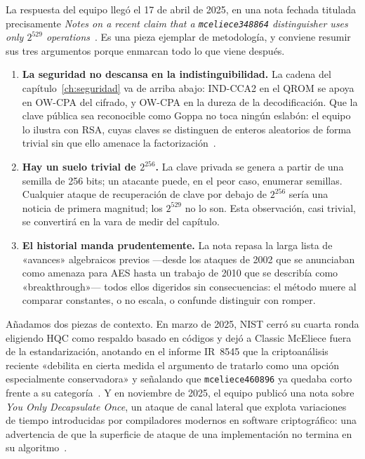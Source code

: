 La respuesta del equipo llegó el 17 de abril de 2025, en una nota
fechada titulada precisamente \emph{Notes on a recent claim that a
\texttt{mceliece348864} distinguisher uses only $2^{529}$
operations}~\cite{cm529}. Es una pieza ejemplar de metodología, y
conviene resumir sus tres argumentos porque enmarcan todo lo que
viene después.

\begin{enumerate}[leftmargin=1.6em,itemsep=3pt]
  \item \textbf{La seguridad no descansa en la indistinguibilidad.}
        La cadena del capítulo~\ref{ch:seguridad} va de arriba
        abajo: IND-CCA2 en el QROM se apoya en OW-CPA del cifrado,
        y OW-CPA en la dureza de la decodificación. Que la clave
        pública sea reconocible como Goppa no toca ningún eslabón:
        el equipo lo ilustra con RSA, cuyas claves se distinguen de
        enteros aleatorios de forma trivial sin que ello amenace la
        factorización~\cite{cm529}.
  \item \textbf{Hay un suelo trivial de $2^{256}$.} La clave privada
        se genera a partir de una semilla de 256 bits; un atacante
        puede, en el peor caso, enumerar semillas. Cualquier ataque
        de recuperación de clave por debajo de $2^{256}$ sería una
        noticia de primera magnitud; los $2^{529}$ no lo son. Esta
        observación, casi trivial, se convertirá en la vara de medir
        del capítulo.
  \item \textbf{El historial manda prudentemente.} La nota repasa la
        larga lista de «avances» algebraicos previos ---desde los
        ataques de 2002 que se anunciaban como amenaza para AES
        hasta un trabajo de 2010 que se describía como
        «breakthrough»--- todos ellos digeridos sin consecuencias:
        el método muere al comparar constantes, o no escala, o
        confunde distinguir con romper.
\end{enumerate}

Añadamos dos piezas de contexto. En marzo de 2025, NIST cerró su
cuarta ronda eligiendo HQC como respaldo basado en códigos y dejó a
Classic McEliece fuera de la estandarización, anotando en el
informe IR~8545 que la criptoanálisis reciente «debilita en cierta
medida el argumento de tratarlo como una opción especialmente
conservadora» y señalando que \texttt{mceliece460896} ya quedaba
corto frente a su categoría~\cite{nist8545}. Y en noviembre de 2025,
el equipo publicó una nota sobre \emph{You Only Decapsulate Once},
un ataque de canal lateral que explota variaciones de tiempo
introducidas por compiladores modernos en software criptográfico:
una advertencia de que la superficie de ataque de una implementación
no termina en su algoritmo~\cite{cm2025yodo}.

